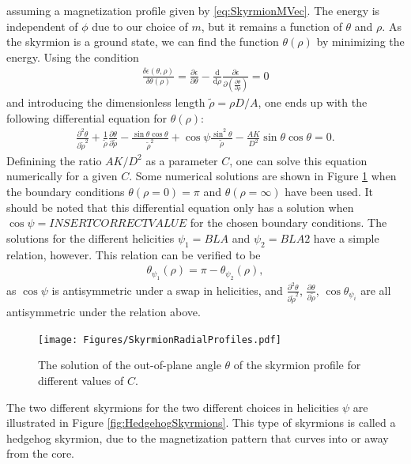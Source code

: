 \documentclass[12pt, a4paper, twoside, openright]{report}
\numberwithin{equation}{chapter}
\numberwithin{figure}{chapter}
\numberwithin{table}{chapter}
\begin{document}
assuming a magnetization profile given by \eqref{eq:SkyrmionMVec}. The energy is independent of $\phi$ due to our choice of $m$, but it remains a function of $\theta$ and $\rho$. As the skyrmion is a ground state, we can find the function $\theta(\rho)$ by minimizing the energy. Using the condition
\begin{align}
\frac{\delta\epsilon(\theta, \rho)}{\delta\theta(\rho)} = \frac{\partial\epsilon}{\partial\theta} - \frac{\textrm{d}}{\textrm{d}\rho} \frac{\partial\epsilon}{\partial (\frac{\partial\theta}{\partial \rho})} = 0
\end{align}
and introducing the dimensionless length $\tilde{\rho} = \rho D/A$, one ends up with the following differential equation for $\theta(\rho)$:
\begin{align}
\label{eq:ODEtheta}
\frac{\partial^2\theta}{\partial\tilde{\rho}^2} + \frac{1}{\tilde{\rho}}\frac{\partial\theta}{\partial\tilde{\rho}} - \frac{\sin\theta\cos\theta}{\tilde{\rho}^2}+\cos\psi\frac{\sin^2\theta}{\tilde{\rho}}-\frac{AK}{D^2}\sin\theta\cos\theta = 0.
\end{align}
Definining the ratio $AK/D^2$ as a parameter $C$, one can solve this equation numerically for a given $C$. Some numerical solutions are shown in Figure \ref{fig:ThetaProfile} when the boundary conditions $\theta(\rho = 0) = \pi$ and $\theta(\rho = \infty)$ have been used. It should be noted that this differential equation only has a solution when $\cos\psi = INSERT CORRECT VALUE$ for the chosen boundary conditions. The solutions for the different helicities $\psi_1 = BLA$ and $\psi_2 = BLA2$ have a simple relation, however. This relation can be verified to be
\begin{align}
\theta_{\psi_1}(\rho) = \pi - \theta_{\psi_2}(\rho),
\end{align}
as $\cos\psi$ is antisymmetric under a swap in helicities, and $\frac{\partial^2\theta}{\partial\tilde{\rho}^2}$, $\frac{\partial\theta}{\partial\tilde{\rho}}$, $\cos\theta_{\psi_i}$ are all antisymmetric under the relation above.
\begin{figure}[h!]
\begin{center}
\texttt{[image: Figures/SkyrmionRadialProfiles.pdf]} 
\caption{The solution of the out-of-plane angle $\theta$ of the skyrmion profile for different values of $C$.}
\label{fig:ThetaProfile} 
\end{center}
\end{figure}
The two different skyrmions for the two different choices in helicities $\psi$ are illustrated in Figure \ref{fig:HedgehogSkyrmions}. This type of skyrmions is called a hedgehog skyrmion, due to the magnetization pattern that curves into or away from the core.
\end{document}
